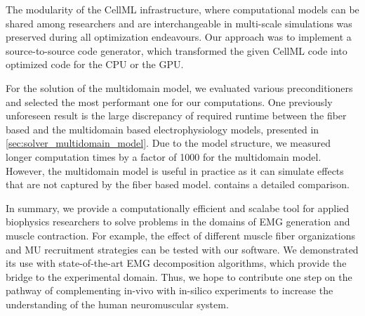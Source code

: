 The modularity of the CellML infrastructure, where computational models can be shared among researchers and are interchangeable in multi-scale simulations was preserved during all optimization endeavours. Our approach was to implement a source-to-source code generator, which transformed the given CellML code into optimized code for the CPU or the GPU.

For the solution of the multidomain model, we evaluated various preconditioners and selected the most performant one for our computations.
One previously unforeseen result is the large discrepancy of required runtime between the fiber based and the multidomain based electrophysiology models, presented in \cref{sec:solver_multidomain_model}. Due to the model structure, we measured longer computation times by a factor of 1000 for the multidomain model. However, the multidomain model is useful in practice as it can simulate effects that are not captured by the fiber based model.  contains a detailed comparison.

In summary, we provide a computationally efficient and scalabe tool for applied biophysics researchers to solve problems in the domains of EMG generation and muscle contraction. For example, the effect of different muscle fiber organizations and MU recruitment strategies can be tested with our software. We demonstrated its use with state-of-the-art EMG decomposition algorithms, which provide the bridge to the experimental domain.
Thus, we hope to contribute one step on the pathway of complementing in-vivo with in-silico experiments to increase the understanding of the human neuromuscular system.









